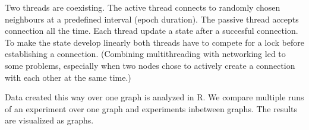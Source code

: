 \documentclass[11pt,a4paper]{article}
\begin{document}
Two threads are coexisting. The active thread connects to randomly chosen neighbours at a predefined interval (epoch duration). The passive thread accepts connection all the time. Each thread update a state after a succesful connection. To make the state develop linearly both threads have to compete for a lock before establishing a connection. (Combining multithreading with networking led to some problems, especially when two nodes chose to actively create a connection with each other at the same time.)

Data created this way over one graph is analyzed in R. We compare multiple runs of an experiment over one graph and experiments inbetween graphs. The results are visualized as graphs.
\end{document}
